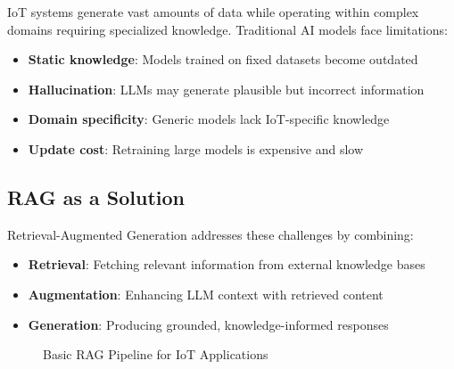 \documentclass[12pt,a4paper]{article}
\begin{document}
IoT systems generate vast amounts of data while operating within complex domains requiring specialized knowledge. Traditional AI models face limitations:
\begin{itemize}[leftmargin=*]
    \item \textbf{Static knowledge}: Models trained on fixed datasets become outdated
    \item \textbf{Hallucination}: LLMs may generate plausible but incorrect information
    \item \textbf{Domain specificity}: Generic models lack IoT-specific knowledge
    \item \textbf{Update cost}: Retraining large models is expensive and slow
\end{itemize}

\subsection{RAG as a Solution}

Retrieval-Augmented Generation addresses these challenges by combining:
\begin{itemize}
    \item \textbf{Retrieval}: Fetching relevant information from external knowledge bases
    \item \textbf{Augmentation}: Enhancing LLM context with retrieved content
    \item \textbf{Generation}: Producing grounded, knowledge-informed responses
\end{itemize}

\begin{figure}[H]
\centering
{}
\caption{Basic RAG Pipeline for IoT Applications}
\end{figure}
\end{document}
